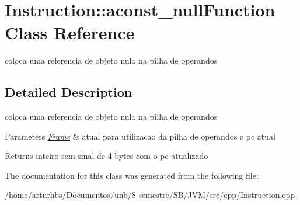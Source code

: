 \hypertarget{classInstruction_1_1aconst__nullFunction}{}\section{Instruction\+:\+:aconst\+\_\+null\+Function Class Reference}
\label{classInstruction_1_1aconst__nullFunction}


coloca uma referencia de objeto nulo na pilha de operandos  




\subsection{Detailed Description}
coloca uma referencia de objeto nulo na pilha de operandos 


\begin{DoxyParams}{Parameters}
{\em \hyperlink{classFrame}{Frame}} & atual para utilizacao da pilha de operandos e pc atual \\
\hline
\end{DoxyParams}
\begin{DoxyReturn}{Returns}
inteiro sem sinal de 4 bytes com o pc atualizado 
\end{DoxyReturn}


The documentation for this class was generated from the following file\+:\begin{DoxyCompactItemize}
\item 
/home/arturhbs/\+Documentos/unb/8 semestre/\+S\+B/\+J\+V\+M/src/cpp/\hyperlink{Instruction_8cpp}{Instruction.\+cpp}\end{DoxyCompactItemize}
